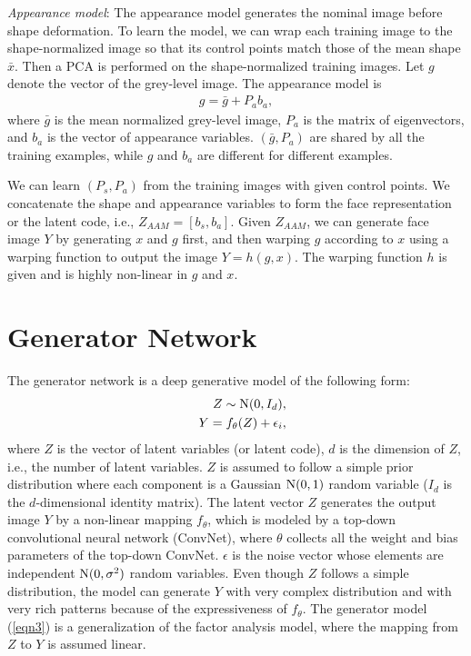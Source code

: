 \documentclass{article}
\begin{document}
\textit{Appearance model}: The appearance model generates the nominal image before shape deformation. To learn the model, we can wrap each training image to the shape-normalized image so that its control points match those of the mean shape $\bar{x}$. Then a PCA is performed on the shape-normalized training images.  Let $g$ denote the vector of the grey-level image. The appearance model is
\begin{eqnarray}
\label{eqn2}
g = \bar{g} + P_a b_a,
\end{eqnarray}
where $\bar{g}$ is the mean normalized grey-level image, $P_a$ is the matrix of eigenvectors,  and $b_a$ is the vector of appearance variables. $(\bar{g}, P_a)$ are shared by all the training examples, while $g$ and $b_a$ are different for different examples.

We can learn $(P_s, P_a)$ from the training images with given control points. We concatenate the shape and appearance variables to form the face representation or the latent code, i.e., $Z_{AAM} = [b_s, b_a]$. Given $Z_{AAM}$, we can generate face image $Y$ by generating $x$ and $g$ first, and then warping $g$ according to $x$ using a warping function to output the image $Y = h(g, x)$. The warping function $h$ is given and is highly non-linear in $g$ and $x$.


\section{Generator Network} \label{sec:VAE} %

The generator network is a deep generative model of the following form:
\begin{eqnarray}
\label{eqn3}
&&Z \sim {\rm N}(0, I_d), \\
 && Y = f_\theta(Z) + \epsilon_i,
\end{eqnarray}
where $Z$ is the vector of latent variables (or latent code), $d$ is the dimension of $Z$, i.e., the number of latent variables. $Z$ is assumed to follow a simple prior distribution where each component is a Gaussian ${\rm N}(0, 1)$ random variable ($I_d$ is the $d$-dimensional identity matrix). The latent vector $Z$ generates the output image $Y$ by a non-linear mapping $f_\theta$, which is modeled by a top-down convolutional neural network (ConvNet), where $\theta$ collects all the weight and bias parameters of the top-down ConvNet. $\epsilon$ is the noise vector whose elements are independent ${\rm N}(0, \sigma^2)$ random variables. Even though $Z$ follows a simple distribution, the model can generate $Y$ with very complex distribution and with very rich patterns because of the expressiveness of $f_\theta$. The generator model (\ref{eqn3}) is a generalization of the factor analysis model, where the mapping from $Z$ to $Y$ is assumed linear.
\end{document}

